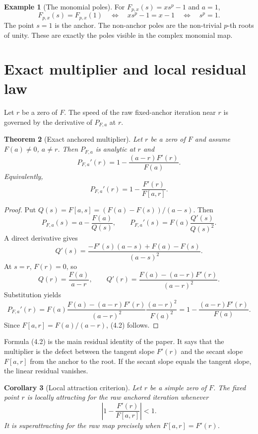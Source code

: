 \documentclass[11pt]{article}
\newtheorem{theorem}{Theorem}[section]
\newtheorem{corollary}[theorem]{Corollary}
\theoremstyle{definition}
\newtheorem{example}[theorem]{Example}
\begin{document}
\begin{example}[The monomial poles]
For $F_{p,x}(s)=xs^p-1$ and $a=1$,
\[
        F_{p,x}(s)=F_{p,x}(1)
        \quad\Longleftrightarrow\quad
        xs^p-1=x-1
        \quad\Longleftrightarrow\quad
        s^p=1.
\]
The point $s=1$ is the anchor.  The non-anchor poles are the non-trivial $p$-th roots of unity.  These are exactly the poles visible in the complex monomial map.
\end{example}

\section{Exact multiplier and local residual law}

Let $r$ be a zero of $F$.  The speed of the raw fixed-anchor iteration near $r$ is governed by the derivative of $P_{F,a}$ at $r$.

\begin{theorem}[Exact anchored multiplier]
Let $r$ be a zero of $F$ and assume $F(a)\ne0$, $a\ne r$.  Then $P_{F,a}$ is analytic at $r$ and
\[
        P_{F,a}'(r)=1-\frac{(a-r)F'(r)}{F(a)}.
        \tag{4.1}
\]
Equivalently,
\[
        P_{F,a}'(r)=1-\frac{F'(r)}{F[a,r]}.
        \tag{4.2}
\]
\end{theorem}

\begin{proof}
Put $Q(s)=F[a,s]=(F(a)-F(s))/(a-s)$.  Then
\[
        P_{F,a}(s)=a-\frac{F(a)}{Q(s)},
        \qquad
        P_{F,a}'(s)=F(a)\frac{Q'(s)}{Q(s)^2}.
\]
A direct derivative gives
\[
        Q'(s)=\frac{-F'(s)(a-s)+F(a)-F(s)}{(a-s)^2}.
\]
At $s=r$, $F(r)=0$, so
\[
        Q(r)=\frac{F(a)}{a-r},
        \qquad
        Q'(r)=\frac{F(a)-(a-r)F'(r)}{(a-r)^2}.
\]
Substitution yields
\[
        P_{F,a}'(r)=F(a)\frac{F(a)-(a-r)F'(r)}{(a-r)^2}\frac{(a-r)^2}{F(a)^2}
        =1-\frac{(a-r)F'(r)}{F(a)}.
\]
Since $F[a,r]=F(a)/(a-r)$, (4.2) follows.
\end{proof}

Formula (4.2) is the main residual identity of the paper.  It says that the multiplier is the defect between the tangent slope $F'(r)$ and the secant slope $F[a,r]$ from the anchor to the root.  If the secant slope equals the tangent slope, the linear residual vanishes.

\begin{corollary}[Local attraction criterion]
Let $r$ be a simple zero of $F$.  The fixed point $r$ is locally attracting for the raw anchored iteration whenever
\[
        \left|1-\frac{F'(r)}{F[a,r]}\right|<1.
        \tag{4.3}
\]
It is superattracting for the raw map precisely when $F[a,r]=F'(r)$.
\end{corollary}
\end{document}
